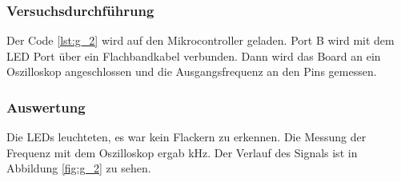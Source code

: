 \documentclass[12pt,a4paper]{article}
\begin{document}
\subsubsection*{Versuchsdurchführung}

Der Code \ref{lst:g_2} wird auf den Mikrocontroller geladen. Port B wird mit dem LED Port über ein Flachbandkabel verbunden. Dann wird das Board an ein Oszilloskop angeschlossen und die Ausgangsfrequenz an den Pins gemessen.

\subsubsection*{Auswertung}

Die LEDs leuchteten, es war kein Flackern zu erkennen. Die Messung der Frequenz mit dem Oszilloskop ergab \unit[28,9]{kHz}. Der Verlauf des Signals ist in Abbildung \ref{fig:g_2} zu sehen.
\end{document}
